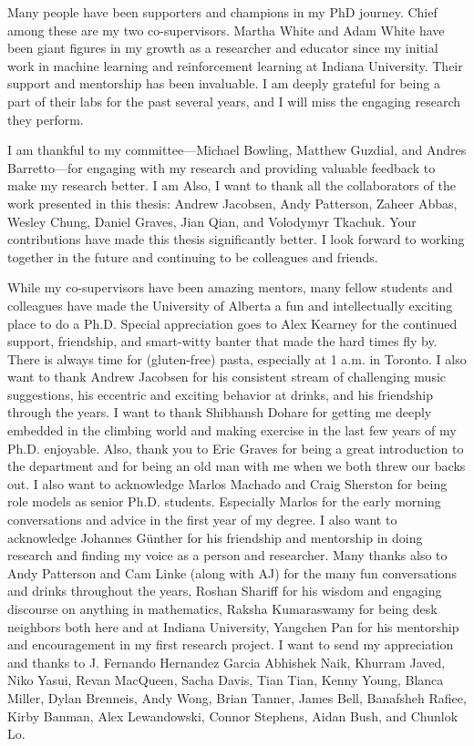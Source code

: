 \documentclass[\main/thesis.tex]{subfiles}
\begin{document}
\begin{acknowledgements}

Many people have been supporters and champions in my PhD journey. Chief among these are my two co-supervisors. Martha White and Adam White have been giant figures in my growth as a researcher and educator since my initial work in machine learning and reinforcement learning at Indiana University. Their support and mentorship has been invaluable. I am deeply grateful for being a part of their labs for the past several years, and I will miss the engaging research they perform.

I am thankful to my committee---Michael Bowling, Matthew Guzdial, and
Andres Barretto---for engaging with my research and providing valuable
feedback to make my research better. I am Also, I want to thank all the collaborators of the work presented in this thesis: Andrew Jacobsen, Andy Patterson, Zaheer Abbas, Wesley Chung, Daniel Graves, Jian Qian, and Volodymyr Tkachuk. Your contributions have made this thesis significantly better. I look forward to working together in the future and continuing to be colleagues and friends. 

While my co-supervisors have been amazing mentors, many
fellow students and colleagues have made the University of Alberta a fun and intellectually exciting place to do a Ph.D. Special appreciation goes to Alex Kearney for the continued support, friendship, and smart-witty banter that made the hard times fly by. There is always time for
(gluten-free) pasta, especially at 1 a.m. in Toronto. I also want to thank Andrew Jacobsen for his consistent stream of challenging music suggestions, his eccentric and exciting behavior at drinks, and his friendship through the years. I want to thank Shibhansh Dohare for getting me deeply embedded in the climbing world and making exercise in the last few years of my Ph.D. enjoyable. Also, thank you to Eric Graves for being a great introduction to the department and for being an old man with me when we both threw our backs out. I also want to acknowledge Marlos Machado and Craig Sherston for being role models as senior Ph.D. students. Especially Marlos for the early morning conversations and advice in the first year of my degree. I
also want to acknowledge Johannes G\"unther for his friendship and
mentorship in doing research and finding my voice as a person and researcher. Many thanks also to Andy Patterson and Cam Linke (along with AJ) for the many fun conversations and drinks throughout the years, Roshan Shariff for his wisdom and engaging discourse on anything in mathematics, Raksha Kumaraswamy for being desk neighbors both here and at Indiana University, Yangchen Pan for his mentorship and
encouragement in my first research project. I want to send my appreciation and thanks to J. Fernando Hernandez Garcia Abhishek Naik, Khurram Javed, Niko Yasui, Revan MacQueen, Sacha Davis, Tian Tian, Kenny Young, Blanca Miller, Dylan Brenneis, Andy Wong, Brian Tanner, James Bell, Banafsheh Rafiee, Kirby Banman, Alex Lewandowski, Connor Stephens, Aidan Bush, and Chunlok Lo.


\end{acknowledgements}
\end{document}
